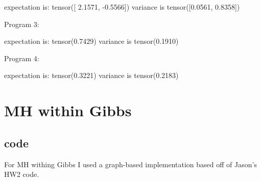 \documentclass[12pt]{article}%
\theoremstyle{definition}
\begin{document}
	expectation is: tensor([ 2.1571, -0.5566])
	variance is tensor([0.0561, 0.8358]) 
	 
	
	Program 3:
	 
	expectation is: tensor(0.7429)
	variance is tensor(0.1910) 
	 
	
	Program 4: 
	 
	expectation is: tensor(0.3221)
	variance is tensor(0.2183) 
	
	
	
	
	
	\section{MH within Gibbs}
	
	\subsection{code}
	For MH withing Gibbs I used a graph-based implementation based off of Jason's HW2 code.
	
\end{document}
